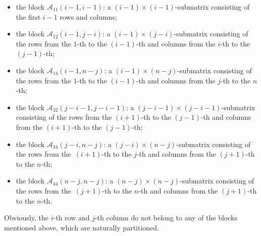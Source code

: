 \documentclass[10pt,a4paper]{amsart}
\numberwithin{equation}{section}
\def\A{\mathscr{A}}
\begin{document}
\begin{itemize}\itemsep=0pt
 \item the block $\A_{11}(i-1,i-1)$: a $(i-1)\times (i-1)$-submatrix consisting of the first $i-1$ rows and columns;
 \item the block $\A_{12}(i-1,j-i)$: a $(i-1)\times (j-i)$-submatrix consisting of the rows from the $1$-th to the $(i-1)$-th and columns from the $i$-th to the $(j-1)$-th;
 \item the block $\A_{14}(i-1,n-j)$: a $(i-1)\times (n-j)$-submatrix consisting of the rows from the $1$-th to the $(i-1)$-th and columns from the $j$-th to the $n$-th;
 \item the block $\A_{32}(j-i-1,j-i-1)$: a $(j-i-1)\times (j-i-1)$-submatrix consisting of the rows from the $(i+1)$-th to the $(j-1)$-th and columns from the $(i+1)$-th to the $(j-1)$-th;
 \item the block $\A_{34}(j-i,n-j)$: a $(j-i)\times (n-j)$-submatrix consisting of the rows from the~$(i+1)$-th to the $j$-th and columns from the $(j+1)$-th to the $n$-th;
 \item the block $ \A_{44}(n-j,n-j)$: a $(n-j)\times (n-j)$-submatrix consisting of the rows from the~$(j+1)$-th to the $n$-th and columns from the $(j+1)$-th to the $n$-th.
\end{itemize}
Obviously, the $i$-th row and $j$-th column do not belong to any of the blocks mentioned above, which are naturally partitioned.
\end{document}
